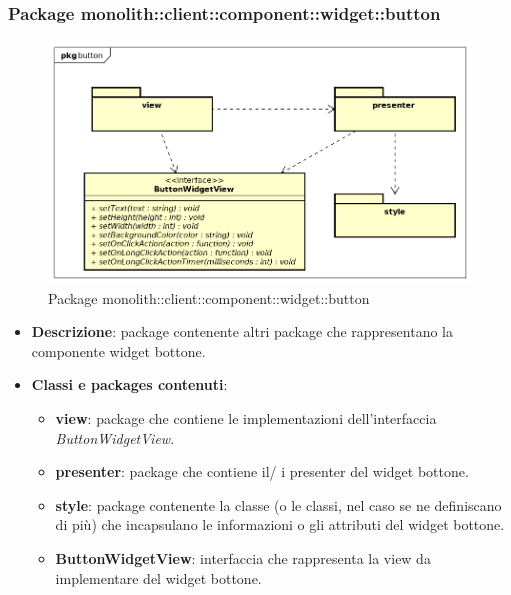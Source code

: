\subsubsection{Package monolith::client::component::widget::button}
\label{Package monolith::client::component::widget::button}
\begin{figure}[H]
	\centering
	\includegraphics[scale=0.5]{Sezioni/Packages/SDK/button.png}
	\caption{Package monolith::client::component::widget::button}
\end{figure}
\begin{itemize}
\item \textbf{Descrizione}: package contenente altri package che rappresentano la componente widget bottone. 
\item \textbf{Classi e packages contenuti}:
\begin{itemize}
\item \textbf{view}: package che contiene le implementazioni dell'interfaccia \textit{ButtonWidgetView}.
\item \textbf{presenter}: package che contiene il/ i presenter del widget bottone.
\item \textbf{style}: package contenente la classe (o le classi, nel caso se ne definiscano di più) che incapsulano le informazioni o gli attributi del widget bottone.
\item \textbf{ButtonWidgetView}: interfaccia che rappresenta la view da implementare del widget bottone.
\end{itemize}
\end{itemize}


